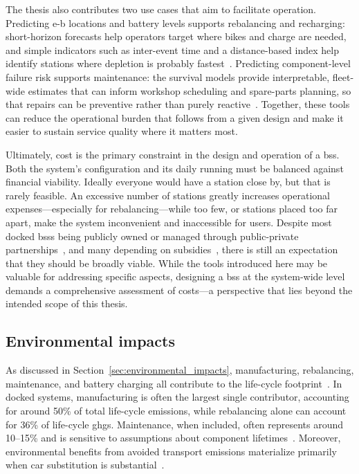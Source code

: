 The thesis also contributes two use cases that aim to facilitate operation. Predicting \ac{e-b} locations and battery levels supports rebalancing and recharging: short-horizon forecasts help operators target where bikes and charge are needed, and simple indicators such as inter-event time and a distance-based index help identify stations where depletion is probably fastest~\cite{Bassolas2025}. Predicting component-level failure risk supports maintenance: the survival models provide interpretable, fleet-wide estimates that can inform workshop scheduling and spare-parts planning, so that repairs can be preventive rather than purely reactive~\cite{Grau-Escolano2024}. Together, these tools can reduce the operational burden that follows from a given design and make it easier to sustain service quality where it matters most.

Ultimately, cost is the primary constraint in the design and operation of a \ac{bss}. Both the system's configuration and its daily running must be balanced against financial viability. Ideally everyone would have a station close by, but that is rarely feasible. An excessive number of stations greatly increases operational expenses—especially for rebalancing—while too few, or stations placed too far apart, make the system inconvenient and inaccessible for users. Despite most docked \acp{bss} being publicly owned or managed through public-private partnerships~\cite{Li2021, Cao2022}, and many depending on subsidies~\cite{Shaheen2010}, there is still an expectation that they should be broadly viable. While the tools introduced here may be valuable for addressing specific aspects, designing a \ac{bss} at the system-wide level demands a comprehensive assessment of costs—a perspective that lies beyond the intended scope of this thesis.


\subsection{Environmental impacts}

As discussed in Section~\ref{sec:environmental_impacts}, manufacturing, rebalancing, maintenance, and battery charging all contribute to the life-cycle footprint~\cite{Luo2019, Calan2024, Zhu2023}. In docked systems, manufacturing is often the largest single contributor, accounting for around 50\% of total life-cycle emissions, while rebalancing alone can account for 36\% of life-cycle \acp{ghg}. Maintenance, when included, often represents around 10--15\% and is sensitive to assumptions about component lifetimes~\cite{Luo2019, Calan2024, Zhu2023, Sun2022}. Moreover, environmental benefits from avoided transport emissions materialize primarily when car substitution is substantial~\cite{Luo2019}.

